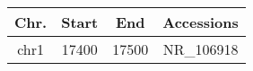 \begin{tabular}{cccc}
\hline
Chr. & Start & End & Accessions\\\hline
chr1 & 17400 & 17500 & NR\_106918\\\hline
\end{tabular}
